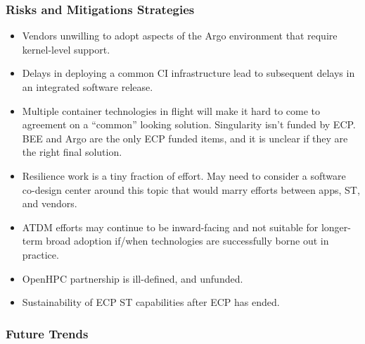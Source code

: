 \subsubsection{Risks and Mitigations Strategies}
\begin{itemize}
	\item Vendors unwilling to adopt aspects of the Argo environment that require kernel-level support.
	\item Delays in deploying a common CI infrastructure lead to subsequent delays in an integrated software release.
	\item Multiple container technologies in flight will make it hard to come to agreement on a “common” looking solution. Singularity isn't funded by ECP. BEE and Argo are the only ECP funded items, and it is unclear if they are the right final solution.
	\item Resilience work is a tiny fraction of effort. May need to consider a software co-design center around this topic that would marry efforts between apps, ST, and vendors.
	\item ATDM efforts may continue to be inward-facing and not suitable for longer-term broad adoption if/when technologies are successfully borne out in practice.
	\item OpenHPC partnership is ill-defined, and unfunded.
	\item Sustainability of ECP ST capabilities after ECP has ended.
\end{itemize}

\subsubsection{Future Trends}
